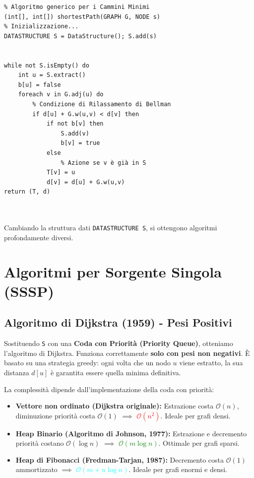 \documentclass[12pt, a4paper]{article}
\begin{document}
\begin{verbatim}
% Algoritmo generico per i Cammini Minimi
(int[], int[]) shortestPath(GRAPH G, NODE s)
% Inizializzazione...
DATASTRUCTURE S = DataStructure(); S.add(s)


while not S.isEmpty() do
    int u = S.extract()
    b[u] = false
    foreach v in G.adj(u) do
        % Condizione di Rilassamento di Bellman
        if d[u] + G.w(u,v) < d[v] then
            if not b[v] then 
                S.add(v)
                b[v] = true
            else
                % Azione se v è già in S
            T[v] = u
            d[v] = d[u] + G.w(u,v)
return (T, d)



\end{verbatim}
Cambiando la struttura dati \texttt{DATASTRUCTURE S}, si ottengono algoritmi profondamente diversi.

\newpage

\section{Algoritmi per Sorgente Singola (SSSP)}

\subsection{Algoritmo di Dijkstra (1959) - Pesi Positivi}
Sostituendo \texttt{S} con una \textbf{Coda con Priorità (Priority Queue)}, otteniamo l'algoritmo di Dijkstra. Funziona correttamente \textbf{solo con pesi non negativi}. È basato su una strategia greedy: ogni volta che un nodo $u$ viene estratto, la sua distanza $d[u]$ è garantita essere quella minima definitiva.

La complessità dipende dall'implementazione della coda con priorità:
\begin{itemize}
\item \textbf{Vettore non ordinato (Dijkstra originale):} Estrazione costa $\mathcal{O}(n)$, diminuzione priorità costa $\mathcal{O}(1)$ $\implies$ \textcolor{red}{$\mathcal{O}(n^2)$}. Ideale per grafi densi.
\item \textbf{Heap Binario (Algoritmo di Johnson, 1977):} Estrazione e decremento priorità costano $\mathcal{O}(\log n)$ $\implies$ \textcolor{green}{$\mathcal{O}(m \log n)$}. Ottimale per grafi sparsi.
\item \textbf{Heap di Fibonacci (Fredman-Tarjan, 1987):} Decremento costa $\mathcal{O}(1)$ ammortizzato $\implies$ \textcolor{cyan}{$\mathcal{O}(m + n \log n)$}. Ideale per grafi enormi e densi.
\end{itemize}
\end{document}
